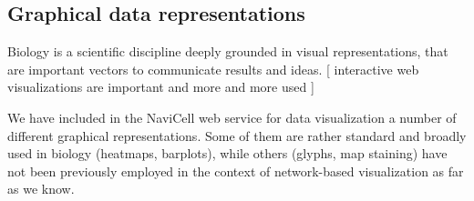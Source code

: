 \documentclass[a4,center,fleqn]{NAR}
\begin{document}
\subsection{Graphical data representations}

Biology is a scientific discipline deeply grounded in visual representations,
that are important vectors to communicate results and ideas. 
[ interactive web visualizations are important and more and more used ]

We have included in the NaviCell web service for data visualization a number of
different graphical representations. Some of them are rather standard
and broadly used in biology (heatmaps, barplots), while others (glyphs, map
staining) have not been previously employed in the context of network-based
visualization as far as we know. 
\end{document}
